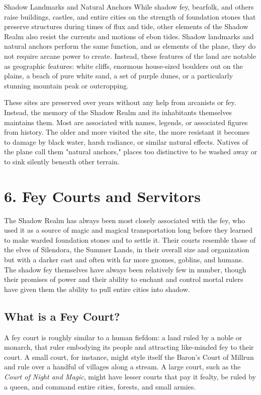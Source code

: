\documentclass[10pt,a4paper,twoside,bg=print,twocolumn,openany,nodeprecatedcode]{dndbook}
\begin{document}
\begin{DndSidebar}[float=!b]{Shadow Landmarks and Natural Anchors}
While shadow fey, bearfolk, and others raise buildings, castles, and entire cities on the strength of foundation stones that preserve structures during times of flux and tide, other elements of the Shadow Realm also resist the currents and motions of ebon tides. Shadow landmarks and natural anchors perform the same function, and as elements of the plane, they do not require arcane power to create. Instead, these features of the land are notable as geographic features: white cliffs, enormous house-sized boulders out on the plains, a beach of pure white sand, a set of purple dunes, or a particularly stunning mountain peak or outcropping.



These sites are preserved over years without any help from arcanists or fey. Instead, the memory of the Shadow Realm and its inhabitants themselves maintains them. Most are associated with names, legends, or associated figures from history. The older and more visited the site, the more resistant it becomes to damage by black water, harsh radiance, or similar natural effects. Natives of the plane call them "natural anchors," places too distinctive to be washed away or to sink silently beneath other terrain.



\end{DndSidebar}

\chapter{6. Fey Courts and Servitors}
The Shadow Realm has always been most closely associated with the fey, who used it as a source of magic and magical transportation long before they learned to make warded foundation stones and to settle it. Their courts resemble those of the elves of Silendora, the Summer Lands, in their overall size and organization but with a darker cast and often with far more gnomes, goblins, and humans. The shadow fey themselves have always been relatively few in number, though their promises of power and their ability to enchant and control mortal rulers have given them the ability to pull entire cities into shadow.

\section{What is a Fey Court?}
A fey court is roughly similar to a human fiefdom: a land ruled by a noble or monarch, that ruler embodying its people and attracting like-minded fey to their court. A small court, for instance, might style itself the Baron's Court of Millrun and rule over a handful of villages along a stream. A large court, such as the \textit{Court of Night and Magic}, might have lesser courts that pay it fealty, be ruled by a queen, and command entire cities, forests, and small armies.
\end{document}

